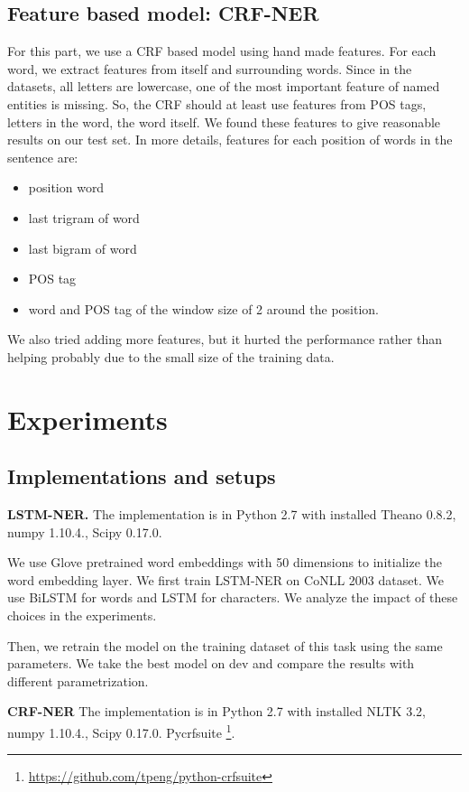 \documentclass[11pt]{article}
\begin{document}
\subsection{Feature based model: CRF-NER}
For this part, we use a CRF based model using hand made features. 
For each word, we extract features from itself and surrounding words.
Since in the datasets, all letters are lowercase, one of the 
most important feature of named entities is missing. 
So, the CRF should at least use features from POS tags, letters in the word, the word itself.
We found these features to give reasonable results on our test set. 
In more details, features for each position of words in the sentence are:
\begin{itemize}
\item 
position word 
\item 
last trigram of word
\item 
last bigram of word
\item 
POS tag
\item 
word and POS tag of the window size of 2 around the position.
\end{itemize}

We also tried adding more features, but it hurted the performance rather than helping
probably due to the small size of the training data. 

\section{Experiments}
\subsection{Implementations and setups}
\textbf{LSTM-NER.}
The implementation is in Python 2.7 with
installed Theano 0.8.2, numpy 1.10.4., Scipy 0.17.0. 

We use Glove pretrained word embeddings with 50 dimensions to initialize the 
word embedding layer.
We first train LSTM-NER on CoNLL 2003 dataset. 
We use BiLSTM for words and LSTM for characters. 
We analyze the impact of these choices in the experiments.

Then, we retrain the model on the training dataset of this task using 
the same parameters. 
We take the best model on dev and compare the results with different parametrization. 

\textbf{CRF-NER}
The implementation is in Python 2.7 with
installed NLTK 3.2, numpy 1.10.4., Scipy 0.17.0. 
Pycrfsuite \footnote{\url{https://github.com/tpeng/python-crfsuite}}.
\end{document}
